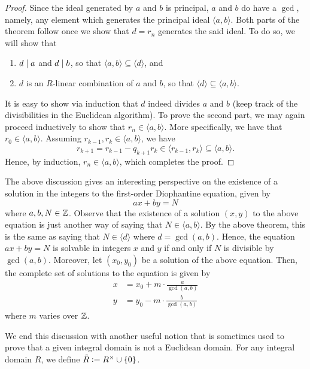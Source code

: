 \begin{proof}
    Since the ideal generated by $a$ and $b$ is principal, $a$ and $b$ do have a $\gcd$, namely, any element which generates the principal ideal $\langle a,b \rangle$. Both parts of the theorem follow once we show that $d = r_n$ generates the said ideal. To do so, we will show that \begin{enumerate}
        \item $d \mid a$ and $d \mid b$, so that $\langle a,b \rangle \subseteq \langle d \rangle$, and
        \item $d$ is an $R$-linear combination of $a$ and $b$, so that $\langle d \rangle \subseteq \langle a,b \rangle$.
    \end{enumerate}
    It is easy to show via induction that $d$ indeed divides $a$ and $b$ (keep track of the divisibilities in the Euclidean algorithm). To prove the second part, we may again proceed inductively to show that $r_n \in \langle a,b \rangle$. More specifically, we have that $r_0 \in \langle a,b \rangle$. Assuming $r_{k-1}, r_k \in \langle a,b \rangle$, we have
    \[
        r_{k+1} = r_{k-1} - q_{k+1} r_k \in \langle r_{k-1}, r_k \rangle \subseteq \langle a,b \rangle.
    \]
    Hence, by induction, $r_n \in \langle a,b \rangle$, which completes the proof.
\end{proof}

\begin{aside}
    The above discussion gives an interesting perspective on the existence of a solution in the integers to the first-order Diophantine equation, given by
    \[
        ax + by = N
    \]
    where $a,b,N \in \mathbb{Z}$. Observe that the existence of a solution $(x,y)$ to the above equation is just another way of saying that $N \in \langle a,b \rangle$. By the above theorem, this is the same as saying that $N \in \langle d \rangle$ where $d = \gcd(a,b)$. Hence, the equation $ax + by = N$ is solvable in integers $x$ and $y$ if and only if $N$ is divisible by $\gcd(a,b)$. Moreover, let $(x_0, y_0)$ be a solution of the above equation. Then, the complete set of solutions to the equation is given by 
    \begin{align*}
        x &= x_0 + m \cdot \frac{a}{\gcd(a,b)} \\
        y &= y_0 - m \cdot \frac{b}{\gcd(a,b)}
    \end{align*}
    where $m$ varies over $\mathbb{Z}$.
\end{aside}

We end this discussion with another useful notion that is sometimes used to prove that a given integral domain is not a Euclidean domain. For any integral domain $R$, we define $\Tilde{R} \vcentcolon= R^{\times} \cup \{0\}$. 

